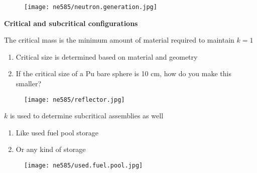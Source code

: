 \documentclass[aspectratio=1610,pdftex,dvipsnames,compress,xcolor={dvipsnames}]{beamer}
\begin{document}
\begin{frame}{}
    \begin{figure}
        \centering
        \texttt{[image: ne585/neutron.generation.jpg]}
    \end{figure}
\end{frame}


\begin{frame}[plain]{}
    \centering\LARGE\textbf{Critical and subcritical configurations}
\end{frame}


\addtocounter{framenumber}{-1} 
\begin{frame}{The critical mass is the minimum amount of material required to maintain $k = 1$}
    \begin{enumerate}[series=outerlist,topsep=0pt,itemsep=21pt,leftmargin=*,label=(\arabic*)]
        \item[]Critical size is determined based on material and geometry
        \item[]If the critical size of a Pu bare sphere is 10 cm, how do you make this smaller?
    \end{enumerate}

    \vspace*{\fill}

    \begin{figure}
        \centering
        \texttt{[image: ne585/reflector.jpg]}
    \end{figure}
\end{frame}


\begin{frame}{$k$ is used to determine subcritical assemblies as well}
    \begin{enumerate}[series=outerlist,topsep=0pt,itemsep=21pt,leftmargin=*,label=(\arabic*)]
        \item[]Like used fuel pool storage
        \item[]Or any kind of storage
    \end{enumerate}
\end{frame}


\begin{frame}{}
    \begin{figure}
        \centering
        \texttt{[image: ne585/used.fuel.pool.jpg]}
    \end{figure}
\end{frame}
\end{document}

